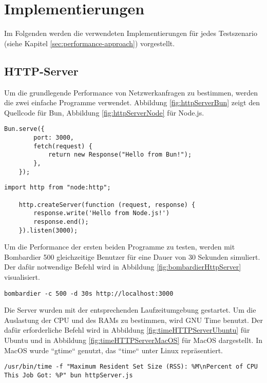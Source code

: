 \section{Implementierungen} \label{sec:performance-implementations}
Im Folgenden werden die verwendeten Implementierungen für jedes Testszenario (siehe Kapitel \ref{sec:performance-approach}) vorgestellt.

\subsection{HTTP-Server} \label{subsec:httpServer}
Um die grundlegende Performance von Netzwerkanfragen zu bestimmen, werden die zwei einfache Programme verwendet. Abbildung  \ref{fig:httpServerBun} zeigt den Quellcode für Bun, Abbildung \ref{fig:httpServerNode} für Node.js.

\begin{lstlisting}[caption={HTTP-Server Bun},label={fig:httpServerBun}]
	Bun.serve({
		port: 3000,
		fetch(request) {
			return new Response("Hello from Bun!");
		},
	});
\end{lstlisting}

\begin{lstlisting}[caption={HTTP-Server Node.js},label={fig:httpServerNode}]
	import http from "node:http";
	
	http.createServer(function (request, response) {
		response.write('Hello from Node.js!')
		response.end();
	}).listen(3000);
\end{lstlisting}

\noindent
Um die Performance der ersten beiden Programme zu testen, werden mit Bombardier 500 gleichzeitige Benutzer für eine Dauer von 30 Sekunden simuliert. Der dafür notwendige Befehl wird in Abbildung \ref{fig:bombardierHttpServer} visualisiert.
\begin{lstlisting}[caption={Bombardier HTTP-Server},label={fig:bombardierHttpServer}]
	bombardier -c 500 -d 30s http://localhost:3000
\end{lstlisting}

\noindent
Die Server wurden mit der entsprechenden Laufzeitumgebung gestartet. Um die Auslastung der CPU und des RAMs zu bestimmen, wird GNU Time benutzt. Der dafür erforderliche Befehl wird in Abbildung \ref{fig:timeHTTPServerUbuntu} für Ubuntu und in Abbildung \ref{fig:timeHTTPServerMacOS} für MacOS dargestellt. In MacOS wurde ``gtime`` genutzt, das ``time`` unter Linux repräsentiert.

\begin{lstlisting}[caption={Bombardier HTTP-Server},label={fig:timeHTTPServerUbuntu}]
	/usr/bin/time -f "Maximum Resident Set Size (RSS): %M\nPercent of CPU This Job Got: %P" bun httpServer.js
\end{lstlisting}


